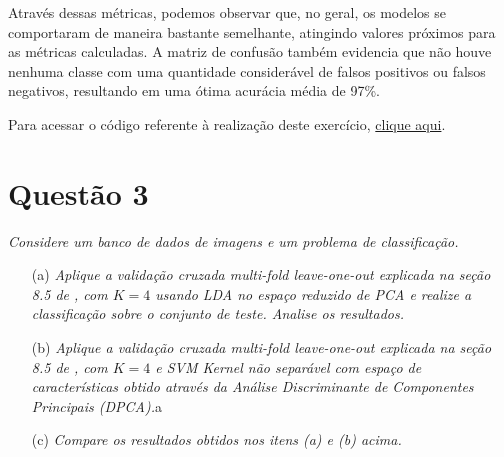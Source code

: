 \documentclass[]{abntex2}
\begin{document}
Através dessas métricas, podemos observar que, no geral, os modelos se comportaram de maneira bastante semelhante, atingindo valores próximos para as métricas calculadas. A matriz de confusão também evidencia que não houve nenhuma classe com uma quantidade considerável de falsos positivos ou falsos negativos, resultando em uma ótima acurácia média de 97\%.

Para acessar o código referente à realização deste exercício, \href{https://github.com/lorran-araujo/LNCC/blob/main/disciplinas/redes-neurais/codes/lista3/exercicio2.ipynb}{clique aqui}.


\section*{\textbf{Questão 3}}

\textit{Considere um banco de dados de imagens e um problema de classificação.}

\begin{enumerate}
    \item[(a)] \textit{ Aplique a validação cruzada multi-fold leave-one-out explicada na seção 8.5 de \cite{book}, com $K = 4$ usando LDA no espaço reduzido de PCA e realize a classificação sobre o conjunto de teste. Analise os resultados.}
    
    \item[(b)] \textit{ Aplique a validação cruzada multi-fold leave-one-out explicada na seção 8.5 de \cite{book}, com $K = 4$ e SVM Kernel não separável com espaço de características obtido através da Análise Discriminante de Componentes Principais (DPCA).}a
    
    \item[(c)] \textit{ Compare os resultados obtidos nos itens (a) e (b) acima.}
\end{enumerate}
\end{document}
